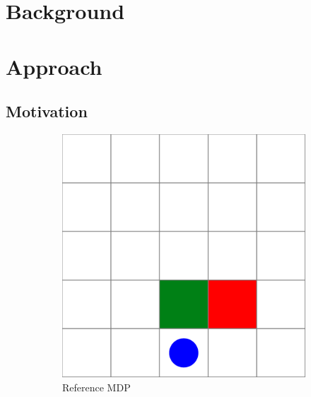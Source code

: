 \section{Background}

\section{Approach}

\subsection{Motivation}

\begin{figure}
    \centering
    \begin{subfigure}[b]{0.375\textwidth}
        \centering
        \includegraphics[width=\textwidth]{figures/iterative_validation/gridworld1.pdf}
        \caption{Reference MDP}    
        \label{fig:ivm_base}
    \end{subfigure}
    \hfill
    \begin{subfigure}[b]{0.375\textwidth}  
        \centering 

\end{subfigure}
\end{figure}
